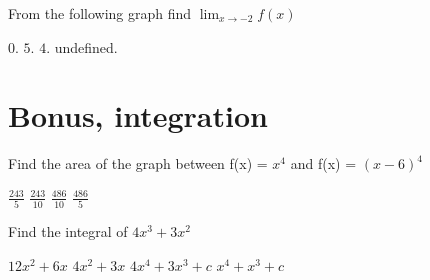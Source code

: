 \documentclass{exam}
\begin{document}
\begin{questions}
	\question
	From the following graph find $\lim_{x \to -2 } f(x)$
	\par\nopagebreak

	\begin{choices}
		\choice $0$.
		\choice $5$.
		\choice $4$.
		\CorrectChoice undefined.
	\end{choices}

\end{questions}

\section{Bonus, integration}

\begin{questions}
	\question Find the area of the graph between f(x) = $x^4$ and f(x) = $(x-6)^4$

	\begin{choices}
		\choice $\frac{243}{5}$
		\choice $\frac{243}{10}$
		\choice $\frac{486}{10}$
		\CorrectChoice $\frac{486}{5}$
	\end{choices}
	\question Find the integral of $ 4x^3+3x^2 $

	\begin{choices}
		\choice $12x^2 + 6x$
		\choice $4x^2 + 3x$
		\choice $4x^4 + 3x^3 + c$
		\CorrectChoice $x^4 + x^3 +c$
	\end{choices}

\end{questions}
\end{document}
